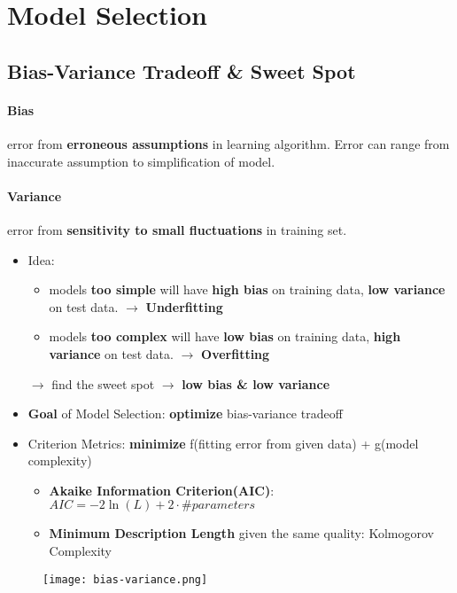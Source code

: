 \section{Model Selection}
\subsection{Bias-Variance Tradeoff \& Sweet Spot}
\paragraph{Bias} error from \textbf{erroneous assumptions} in learning algorithm. Error can range from inaccurate assumption to simplification of model.
\paragraph{Variance} error from \textbf{sensitivity to small fluctuations} in training set.
\begin{itemize}
	\item Idea: 
	\begin{itemize}
		\item models \textbf{too simple} will have \textbf{high bias} on training data, \textbf{low variance} on test data.  $\rightarrow$ \textbf{Underfitting}
		\item models \textbf{too complex} will have \textbf{low bias} on training data, \textbf{high variance} on test data. $\rightarrow$ \textbf{Overfitting}
	\end{itemize}
	
	$\rightarrow$ find the sweet spot $\rightarrow$ \textbf{low bias \& low variance}
	
	\item \textbf{Goal} of Model Selection: \textbf{optimize} bias-variance tradeoff
	\item Criterion Metrics: \textbf{minimize} f(fitting error from given data) + g(model complexity)
	\begin{itemize}
		\item \textbf{Akaike Information Criterion(AIC)}: $AIC = -2\ln(L) + 2\cdot \#parameters$
		\item \textbf{Minimum Description Length} given the same quality: Kolmogorov Complexity
	\end{itemize}
\end{itemize}
\begin{figure}[H]
	\centering
	\texttt{[image: bias-variance.png]}
\end{figure}

